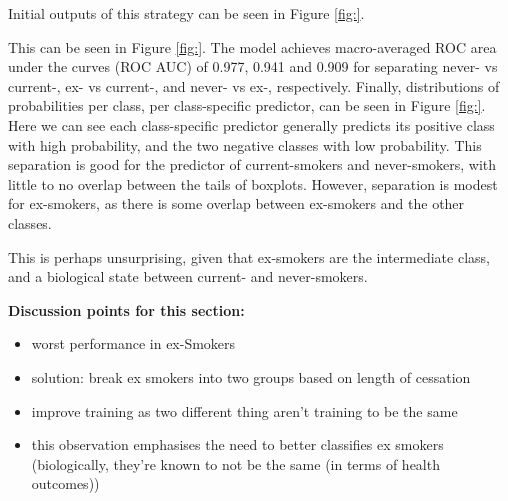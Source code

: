\documentclass{article}
\begin{document}
Initial outputs of this strategy can be seen in Figure \ref{fig:}.

This can be seen in Figure \ref{fig:}. The model achieves macro-averaged ROC area under the curves (ROC AUC) of 0.977, 0.941 and 0.909 for separating never- vs current-, ex- vs current-, and never- vs ex-, respectively.
Finally, distributions of probabilities per class, per class-specific predictor, can be seen in Figure \ref{fig:}. Here we can see each class-specific predictor generally predicts its positive class with high probability, and the two negative classes with low probability. This separation is good for the predictor of current-smokers and never-smokers, with little to no overlap between the tails of boxplots. However, separation is modest for ex-smokers, as there is some overlap between ex-smokers and the other classes.


This is perhaps unsurprising, given that ex-smokers are the intermediate class, and a biological state between current- and never-smokers.


\textbf{Discussion points for this section:}
\begin{itemize}
    \item worst performance in ex-Smokers
    \item solution: break ex smokers into two groups based on length of cessation
    \item improve training as two different thing aren't training to be the same
    \item this observation emphasises the need to better classifies ex smokers (biologically, they're known to not be the same (in terms of health outcomes))
\end{itemize}


\end{document}
